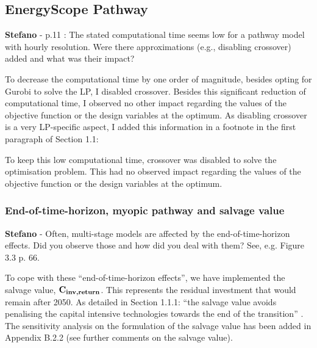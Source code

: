 \documentclass[12pt,a4paper]{article}
\begin{document}
\subsection{EnergyScope Pathway}
\label{ESPathway}
\begin{mdframed}[style=comment] %
{\color{orange} \textbf{Stefano}} - p.11 : The stated computational time seems low for a pathway model with hourly resolution. Were there approximations (e.g., disabling crossover) added and what was their impact?\end{mdframed}

\noindent To decrease the computational time by one order of magnitude, besides opting for Gurobi to solve the LP, I disabled crossover. Besides this significant reduction of computational time, I observed no other impact regarding the values of the objective function or the design variables at the optimum. As disabling crossover is a very LP-specific aspect, I added this information {\color{blue}in a footnote in the first paragraph of Section 1.1}:

\begin{mdframed}[style=manuscript] %
To keep this low computational time, crossover was disabled to solve the optimisation problem. This had no observed impact regarding the values of the objective function or the design variables at the optimum.
\end{mdframed}

\subsubsection{End-of-time-horizon, myopic pathway and salvage value}

\begin{mdframed}[style=comment] %
{\color{orange} \textbf{Stefano}} - Often, multi-stage models are affected by the end-of-time-horizon effects. Did you observe those and how did you deal with them? See, e.g. Figure 3.3 p. 66.
\end{mdframed}

 \noindent To cope with these ``end-of-time-horizon effects'', we have implemented the salvage value, $\textbf{C\textsubscript{inv,return}}$. This represents the residual investment that would remain after 2050. As detailed in Section 1.1.1: ``the salvage value avoids penalising the capital intensive technologies towards the end of the transition'' \cite{poncelet2016myopic}. The sensitivity analysis on the formulation of the salvage value has been added in Appendix B.2.2 (see further comments on the salvage value).
\end{document}
